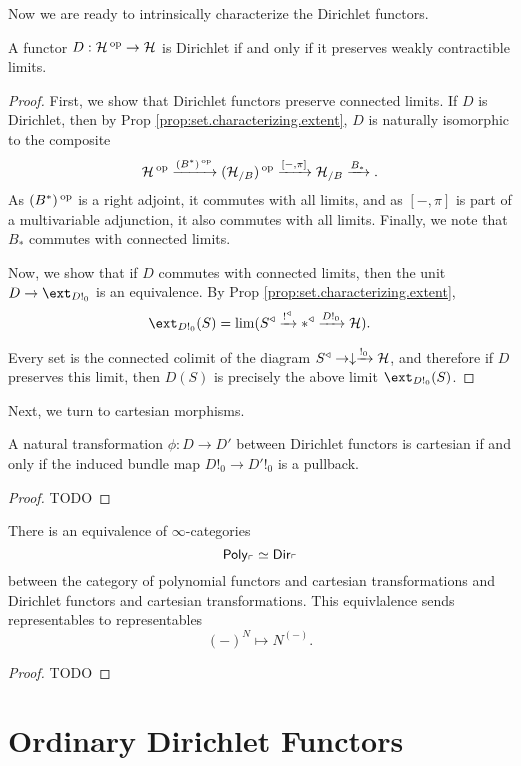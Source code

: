 Now we are ready to intrinsically characterize the Dirichlet functors.
\begin{thm}
A functor $D : \operatorname{\mathcal{H}}\operatorname{^\text{op}} \to \operatorname{\mathcal{H}}$ is Dirichlet if and only if it preserves
weakly contractible limits. 
\end{thm}
\begin{proof}
First, we show that Dirichlet functors preserve connected limits. If $D$ is
Dirichlet, then by Prop \ref{prop:set.characterizing.extent}, $D$ is naturally
isomorphic to the composite
$$\operatorname{\mathcal{H}}\operatorname{^\text{op}} \xrightarrow{(B^{\ast})\operatorname{^\text{op}}} (\operatorname{\mathcal{H}}_{/B})\operatorname{^\text{op}} \xrightarrow{[-, \pi]} \operatorname{\mathcal{H}}_{/B}
\xrightarrow{B_\ast}.$$
As $(B^{\ast})\operatorname{^\text{op}}$ is a right adjoint, it commutes with all limits, and as $[-,\pi]$
is part of a multivariable adjunction, it also commutes with all limits.
Finally, we note that $B_{\ast}$ commutes with connected limits.

Now, we show that if $D$ commutes with connected limits, then the unit
$D \to \ext_{D!_0}$ is an equivalence. By Prop
\ref{prop:set.characterizing.extent}, 
  $$\ext_{D!_0}(S) = \lim(S^{\triangleleft} \xto{!^{\triangleleft}} \ast^{\triangleleft}
  \xto{D!_0} \Ha).$$
  
Every set is the connected colimit of the diagram $S^{\triangleleft} \to
\downarrow \xrightarrow{!_0} \operatorname{\mathcal{H}}$, and therefore if $D$ preserves this limit, then
$D(S)$ is precisely the above limit $\ext_{D!_0}(S)$.
\end{proof}

Next, we turn to cartesian morphisms.
\begin{prop}
A natural transformation $\phi : D \to D'$ between Dirichlet functors is
cartesian if and only if the induced bundle map $D!_0 \to D'!_0$ is a pullback.
\end{prop}
\begin{proof}
TODO
\end{proof}

\begin{thm}
  There is an equivalence of $\infty$-categories
  $$\mathsf{{Poly}}_{\ulcorner} \simeq \operatorname{\mathsf{{Dir}}}_{\ulcorner}$$
  between the category of polynomial functors and cartesian transformations and
  Dirichlet functors and cartesian transformations. This equivlalence sends
  representables to representables
  $$(-)^N \mapsto N^{(-)}.$$
\end{thm}
\begin{proof}
TODO
\end{proof}


\section{Ordinary Dirichlet Functors} \label{sec:ordinary.dirichlet.functors}






